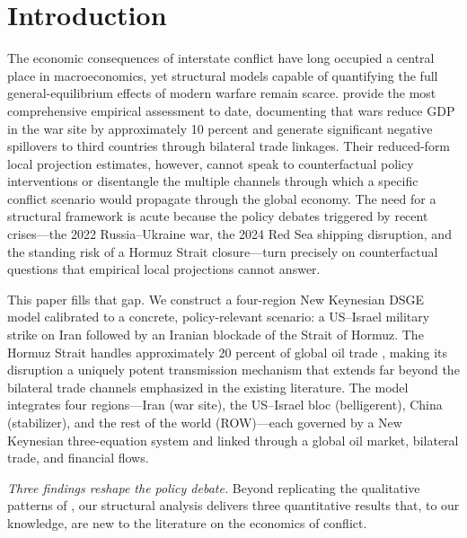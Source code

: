 \documentclass[12pt,a4paper]{article}
\begin{document}
\newpage
\setcounter{page}{1}


\section{Introduction}

The economic consequences of interstate conflict have long occupied a central place in macroeconomics, yet structural models capable of quantifying the full general-equilibrium effects of modern warfare remain scarce. \citet{federle2026price} provide the most comprehensive empirical assessment to date, documenting that wars reduce GDP in the war site by approximately 10 percent and generate significant negative spillovers to third countries through bilateral trade linkages. Their reduced-form local projection estimates, however, cannot speak to counterfactual policy interventions or disentangle the multiple channels through which a specific conflict scenario would propagate through the global economy. The need for a structural framework is acute because the policy debates triggered by recent crises---the 2022 Russia--Ukraine war, the 2024 Red Sea shipping disruption, and the standing risk of a Hormuz Strait closure---turn precisely on counterfactual questions that empirical local projections cannot answer.

This paper fills that gap. We construct a four-region New Keynesian DSGE model calibrated to a concrete, policy-relevant scenario: a US--Israel military strike on Iran followed by an Iranian blockade of the Strait of Hormuz. The Hormuz Strait handles approximately 20 percent of global oil trade \citep{eia2023hormuz}, making its disruption a uniquely potent transmission mechanism that extends far beyond the bilateral trade channels emphasized in the existing literature. The model integrates four regions---Iran (war site), the US--Israel bloc (belligerent), China (stabilizer), and the rest of the world (ROW)---each governed by a New Keynesian three-equation system and linked through a global oil market, bilateral trade, and financial flows.

\textit{Three findings reshape the policy debate.} Beyond replicating the qualitative patterns of \citet{federle2026price}, our structural analysis delivers three quantitative results that, to our knowledge, are new to the literature on the economics of conflict.
\end{document}
